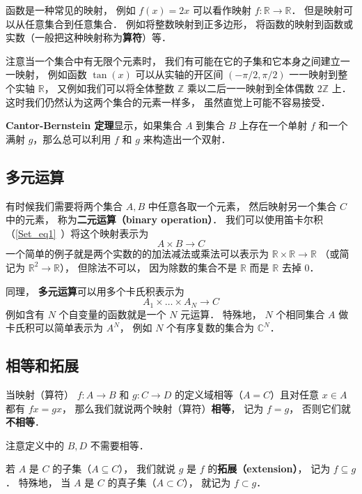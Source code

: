 函数是一种常见的映射， 例如 $f(x) = 2x$ 可以看作映射 $f: \mathbb R \to \mathbb R$． 但是映射可以从任意集合到任意集合． 例如将整数映射到正多边形， 将函数的映射到函数或实数（一般把这种映射称为\textbf{算符}）等．

注意当一个集合中有无限个元素时， 我们有可能在它的子集和它本身之间建立一一映射， 例如函数 $\tan(x)$ 可以从实轴的开区间 $(-\pi/2, \pi/2)$ 一一映射到整个实轴 $\mathbb R$， 又例如我们可以将全体整数 $\mathbb Z$ 乘以二后一一映射到全体偶数 $2\mathbb Z$ 上． 这时我们仍然认为这两个集合的元素一样多， 虽然直觉上可能不容易接受．

\textbf{Cantor-Bernstein 定理}显示，如果集合 $A$ 到集合 $B$ 上存在一个单射 $f$ 和一个满射 $g$，那么总可以利用 $f$ 和 $g$ 来构造出一个双射．

\subsection{多元运算}\label{map_sub1}
有时候我们需要将两个集合 $A, B$ 中任意各取一个元素， 然后映射另一个集合 $C$ 中的元素， 称为\textbf{二元运算（binary operation）}． 我们可以使用笛卡尔积（\autoref{Set_eq1}~）将这个映射表示为
\begin{equation}\label{map_eq1}
A \times B \to C
\end{equation}
一个简单的例子就是两个实数的的加法减法或乘法可以表示为 $\mathbb R \times \mathbb R \to \mathbb R$ （或简记为 $\mathbb R^2 \to \mathbb R$）， 但除法不可以， 因为除数的集合不是 $\mathbb R$ 而是 $\mathbb R$ 去掉 $0$．

同理， \textbf{多元运算}可以用多个卡氏积表示为
\begin{equation}
A_1 \times \dots \times A_N \to C
\end{equation}
例如含有 $N$ 个自变量的函数就是一个 $N$ 元运算． 特殊地， $N$ 个相同集合 $A$ 做卡氏积可以简单表示为 $A^N$， 例如 $N$ 个有序复数的集合为 $\mathbb C^N$．

\subsection{相等和拓展}
\begin{definition}{}
当映射（算符） $f:A\to B$ 和 $g:C\to D$ 的定义域相等（$A = C$）且对任意 $x\in A$ 都有 $fx = gx$， 那么我们就说两个映射（算符）\textbf{相等}， 记为 $f = g$， 否则它们就\textbf{不相等}．
\end{definition}
注意定义中的 $B, D$ 不需要相等．
\begin{definition}{}
若 $A$ 是 $C$ 的子集（$A\subseteq C$）， 我们就说 $g$ 是 $f$ 的\textbf{拓展（extension）}， 记为 $f \subseteq g$． 特殊地， 当 $A$ 是 $C$ 的真子集（$A\subset C$）， 就记为 $f \subset g$．
\end{definition}

